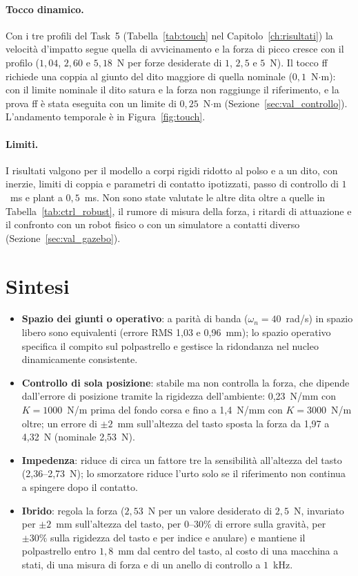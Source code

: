 \paragraph{Tocco dinamico.} Con i tre profili del Task~5 (Tabella~\ref{tab:touch} nel Capitolo~\ref{ch:risultati}) la velocità d'impatto segue quella di avvicinamento e la forza di picco cresce con il profilo ($1{,}04$, $2{,}60$ e $5{,}18$~N per forze desiderate di $1$, $2{,}5$ e $5$~N). Il tocco ff richiede una coppia al giunto del dito maggiore di quella nominale ($0{,}1$~N$\cdot$m): con il limite nominale il dito satura e la forza non raggiunge il riferimento, e la prova ff è stata eseguita con un limite di $0{,}25$~N$\cdot$m (Sezione~\ref{sec:val_controllo}). L'andamento temporale è in Figura~\ref{fig:touch}.

\paragraph{Limiti.}
I risultati valgono per il modello a corpi rigidi ridotto al polso e a un dito, con inerzie, limiti di coppia e parametri di contatto ipotizzati, passo di controllo di $1$~ms e plant a $0{,}5$~ms.
Non sono state valutate le altre dita oltre a quelle in Tabella~\ref{tab:ctrl_robust}, il rumore di misura della forza, i ritardi di attuazione e il confronto con un robot fisico o con un simulatore a contatti diverso (Sezione~\ref{sec:val_gazebo}).


\section{Sintesi}

\begin{itemize}
    \item \textbf{Spazio dei giunti o operativo}: a parità di banda ($\omega_n=40$~rad/s) in spazio libero sono equivalenti (errore RMS 1,03 e 0,96~mm); lo spazio operativo specifica il compito sul polpastrello e gestisce la ridondanza nel nucleo dinamicamente consistente.
    \item \textbf{Controllo di sola posizione}: stabile ma non controlla la forza, che dipende dall'errore di posizione tramite la rigidezza dell'ambiente: 0,23~N/mm con $K=1000$~N/m prima del fondo corsa e fino a 1,4~N/mm con $K=3000$~N/m oltre; un errore di $\pm2$~mm sull'altezza del tasto sposta la forza da 1,97 a 4,32~N (nominale 2,53~N).
    \item \textbf{Impedenza}: riduce di circa un fattore tre la sensibilità all'altezza del tasto (2,36--2,73~N); lo smorzatore riduce l'urto solo se il riferimento non continua a spingere dopo il contatto.
    \item \textbf{Ibrido}: regola la forza ($2,53$~N per un valore desiderato di $2{,}5$~N, invariato per $\pm2$~mm sull'altezza del tasto, per $0$--$30\%$ di errore sulla gravità, per $\pm30\%$ sulla rigidezza del tasto e per indice e anulare) e mantiene il polpastrello entro $1{,}8$~mm dal centro del tasto, al costo di una macchina a stati, di una misura di forza e di un anello di controllo a $1$~kHz.
\end{itemize}